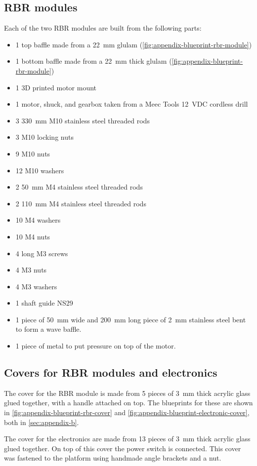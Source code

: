 \subsection{RBR modules}
Each of the two RBR modules are built from the following parts:
\begin{itemize}
  \item 1 top baffle made from a 22~mm glulam (\cref{fig:appendix-blueprint-rbr-module})
  \item 1 bottom baffle made from a 22~mm thick glulam (\cref{fig:appendix-blueprint-rbr-module})
  \item 1 3D printed motor mount
  \item 1 motor, shuck, and gearbox taken from a Meec Tools 12~VDC cordless drill 
  \item 3 330~mm M10 stainless steel threaded rods
  \item 3 M10 locking nuts
  \item 9 M10 nuts
  \item 12 M10 washers
  \item 2 50~mm M4 stainless steel threaded rods
  \item 2 110~mm M4 stainless steel threaded rods
  \item 10 M4 washers
  \item 10 M4 nuts
  \item 4 long M3 screws
  \item 4 M3 nuts
  \item 4 M3 washers
  \item 1 shaft guide NS29
  \item 1 piece of 50~mm wide and 200~mm long piece of 2~mm stainless steel
    bent to form a wave baffle.
  \item 1 piece of metal to put pressure on top of the motor.
\end{itemize}

\subsection{Covers for RBR modules and electronics}
The cover for the RBR module is made from 5 pieces of 3~mm thick acrylic glass
glued together, with a handle attached on top. The blueprints for these are shown in
\cref{fig:appendix-blueprint-rbr-cover} and \cref{fig:appendix-blueprint-electronic-cover},
both in \cref{sec:appendix-b}.

The cover for the electronics are made from 13 pieces of 3~mm thick acrylic glass
glued together. On top of this cover the power switch is connected. This cover
was fastened to the platform using handmade angle brackets and a nut.

